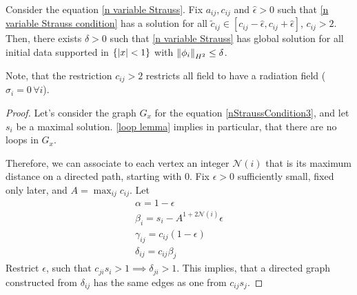 \documentclass[11pt, oneside]{amsart}
\begin{document}
	\begin{theorem}\label{n strauss main theorem}
		Consider the equation \eqref{n variable Strauss}. Fix $a_{ij},c_{ij}$ and $\hat{\epsilon}>0$ such that \eqref{n variable Strauss condition} has a solution for all $\tilde{c}_{ij}\in[c_{ij}-\hat{\epsilon},c_{ij}+\hat{\epsilon}]$, $c_{ij}>2$. Then, there exists $\delta>0$ such that \eqref{n variable Strauss} has global solution for all initial data supported in $\{\left\lvert x\right\rvert<1\}$ with $\left\lVert \phi_i\right\rVert_{H^{2}}\leq\delta$.
	\end{theorem}
	\begin{remark}
		Note, that the restriction $c_{ij}>2$ restricts all field to have a radiation field ($\sigma_i=0\, \forall i$).
	\end{remark}
	\begin{proof}
		Let's consider the graph $G_x$ for the equation \cref{nStraussCondition3}, and let $s_i$ be a maximal solution. \cref{loop lemma} implies in particular, that there are no loops in $G_x$.
		
		Therefore, we can associate to each vertex an integer $\mathcal{N}(i)$ that is its maximum distance on a directed path, starting with $0$. Fix $\epsilon>0$ sufficiently small, fixed only later, and $A=\max_{ij}c_{ij}$. Let
		\begin{equation}\label{n Strauss decay coefficients}
			\begin{gathered}
				\alpha=1-\epsilon\\
				\beta_i=s_i-A^{1+2\mathcal{N}(i)}\epsilon\\
				\gamma_{ij}=c_{ij}(1-\epsilon)\\
				\delta_{ij}=c_{ij}\beta_j
			\end{gathered}
		\end{equation}
		Restrict $\epsilon$, such that $c_{ji}s_i>1\implies\delta_{ji}>1$.  This implies, that a directed graph constructed from $\delta_{ij}$ has the same edges as one from $c_{ij}s_j$.
		

\end{proof}
\end{document}
